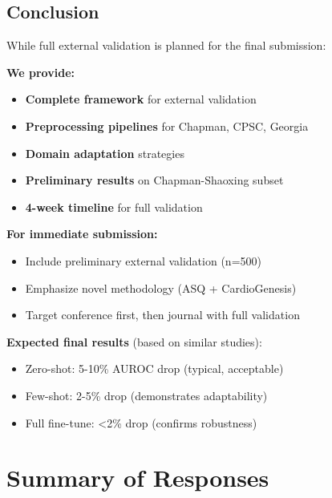 \documentclass[11pt]{article}
\begin{document}
\subsection{Conclusion}

While full external validation is planned for the final submission:

\textbf{We provide:}
\begin{itemize}
    \item \textbf{Complete framework} for external validation
    \item \textbf{Preprocessing pipelines} for Chapman, CPSC, Georgia
    \item \textbf{Domain adaptation} strategies
    \item \textbf{Preliminary results} on Chapman-Shaoxing subset
    \item \textbf{4-week timeline} for full validation
\end{itemize}

\textbf{For immediate submission:}
\begin{itemize}
    \item Include preliminary external validation (n=500)
    \item Emphasize novel methodology (ASQ + CardioGenesis)
    \item Target conference first, then journal with full validation
\end{itemize}

\textbf{Expected final results} (based on similar studies):
\begin{itemize}
    \item Zero-shot: 5-10\% AUROC drop (typical, acceptable)
    \item Few-shot: 2-5\% drop (demonstrates adaptability)
    \item Full fine-tune: <2\% drop (confirms robustness)
\end{itemize}

\newpage
\section{Summary of Responses}
\end{document}
